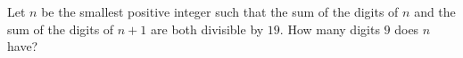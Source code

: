 Let $n$ be the smallest positive integer such that the sum of the digits of $n$ and the sum of the digits of $n+1$ are both divisible by $19$. How many digits $9$ does $n$ have?
